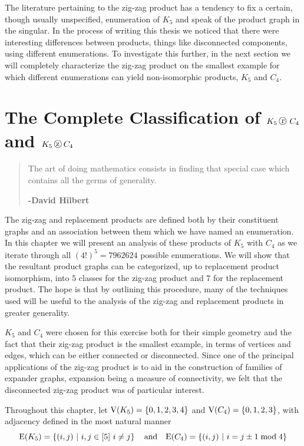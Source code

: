 The literature pertaining to the zig-zag product has a tendency to fix a certain, though usually unspecified, enumeration of $K_5$ and speak of the product graph in the singular. In the process of writing this thesis we noticed that there were interesting differences between products, things like disconnected components, using different enumerations. To investigate this further, in the next section we will completely characterize the zig-zag product on the smallest example for which different enumerations can yield non-isomorphic products, $K_5$ and $C_4$. 

\chapter{The Complete Classification of $K_5 \protect \replacement C_4$ and $K_5 \protect \zigzag C_4$}
\label{chapt:K5zzC4}

\begin{quote}
The art of doing mathematics consists in finding that special case which contains all the germs of generality.

\hfill {\bf -David Hilbert}

\end{quote}

The zig-zag and replacement products are defined both by their constituent graphs and an association between them which we have named an enumeration. In this chapter we will present an analysis of these products of $K_5$ with $C_4$ as we iterate through all $ \left(4! \right)^5 = 7962624$ possible enumerations. We will show that the resultant product graphs can be categorized, up to replacement product isomorphism, into $5$ classes for the zig-zag product and $7$ for the replacement product. The hope is that by outlining this procedure, many of the techniques used will be useful to the analysis of the zig-zag and replacement products in greater generality. 

$K_5$ and $C_4$ were chosen for this exercise both for their simple geometry and the fact that their zig-zag product is the smallest example, in terms of vertices and edges, which can be either connected or disconnected. Since one of the principal applications of the zig-zag product is to aid in the construction of families of expander graphs, expansion being a measure of connectivity, we felt that the disconnected zig-zag product was of particular interest.

Throughout this chapter, let $\mathrm{V}(K_5) = \left\{0,1,2,3,4 \right\}$ and $\mathrm{V}(C_4) = \left\{0,1,2,3 \right\}$, with adjacency defined in the most natural manner \[ \edgeS{K_5} = \left\{(i,j)\ \vert \ i,j \in [5]\ i \neq j \right\} \quad \textrm{and} \quad \edgeS{C_4} = \left\{ (i,j) \ \vert \ i = j \pm 1 \bmod 4 \right\} \]

